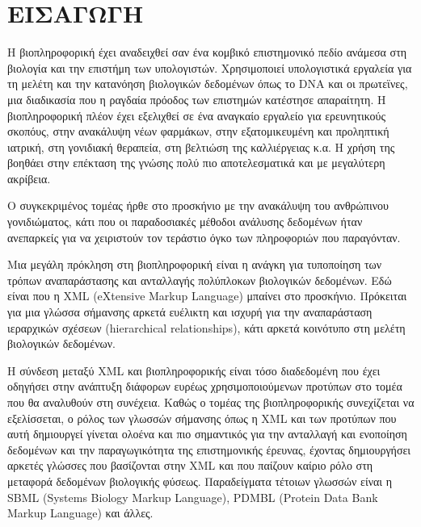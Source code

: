 \chapter{ΕΙΣΑΓΩΓΗ}

    Η βιοπληροφορική έχει αναδειχθεί σαν ένα κομβικό επιστημονικό πεδίο ανάμεσα στη βιολογία και την επιστήμη των υπολογιστών.
    Χρησιμοποιεί υπολογιστικά εργαλεία για τη μελέτη και την κατανόηση βιολογικών δεδομένων όπως το DNA και οι πρωτεϊνες, μια διαδικασία που η ραγδαία πρόοδος των επιστημών κατέστησε απαραίτητη.
    Η βιοπληροφορική πλέον έχει εξελιχθεί σε ένα αναγκαίο εργαλείο για ερευνητικούς σκοπόυς, στην ανακάλυψη νέων φαρμάκων, στην εξατομικευμένη και προληπτική ιατρική, στη γονιδιακή θεραπεία, στη βελτιώση της καλλιέργειας κ.α.
    Η χρήση της βοηθάει στην επέκταση της γνώσης πολύ πιο αποτελεσματικά και με μεγαλύτερη ακρίβεια.

    Ο συγκεκριμένος τομέας ήρθε στο προσκήνιο με την ανακάλυψη του ανθρώπινου γονιδιώματος, κάτι που οι παραδοσιακές μέθοδοι ανάλυσης δεδομένων ήταν ανεπαρκείς για να χειριστούν τον τεράστιο όγκο των πληροφοριών που παραγόνταν.

    Μια μεγάλη πρόκληση στη βιοπληροφορική είναι η ανάγκη για τυποποίηση των τρόπων αναπαράστασης και ανταλλαγής πολύπλοκων βιολογικών δεδομένων.
    Εδώ είναι που η XML (eXtensive Markup Language) μπαίνει στο προσκήνιο.
    Πρόκειται για μια γλώσσα σήμανσης αρκετά ευέλικτη και ισχυρή για την αναπαράσταση ιεραρχικών σχέσεων (hierarchical relationships), κάτι αρκετά κοινότυπο στη μελέτη βιολογικών δεδομένων.

    Η σύνδεση μεταξύ XML και βιοπληροφορικής είναι τόσο διαδεδομένη που έχει οδηγήσει στην ανάπτυξη διάφορων ευρέως χρησιμοποιούμενων προτύπων στο τομέα που θα αναλυθούν στη συνέχεια.
    Καθώς ο τομέας της βιοπληροφορικής συνεχίζεται να εξελίσσεται, ο ρόλος των γλωσσών σήμανσης όπως η XML και των προτύπων που αυτή δημιουργεί γίνεται ολοένα και πιο σημαντικός για την ανταλλαγή και ενοποίηση δεδομένων και την παραγωγικότητα της επιστημονικής έρευνας,
        έχοντας δημιουργήσει αρκετές γλώσσες που βασίζονται στην XML και που παίζουν καίριο ρόλο στη μεταφορά δεδομένων βιολογικής φύσεως.
    Παραδείγματα τέτοιων γλωσσών είναι η SBML (Systems Biology Markup Language), PDMBL (Protein Data Bank Markup Language) και άλλες.
